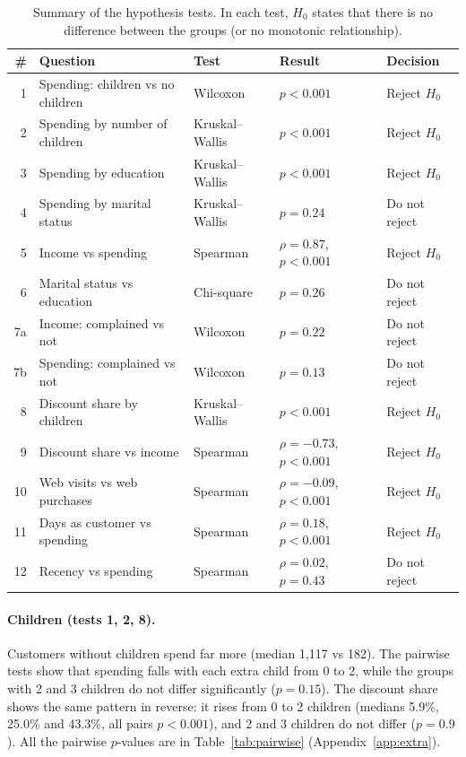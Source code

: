 \documentclass[11pt,a4paper]{article}
\begin{document}
\begin{table}[H]
	\centering
	\small
	\begin{tabular}{rllll}
		\toprule
		\# & Question                          & Test            & Result                      & Decision      \\
		\midrule
		1  & Spending: children vs no children & Wilcoxon        & $p < 0.001$                 & Reject $H_0$  \\
		2  & Spending by number of children    & Kruskal--Wallis & $p < 0.001$                 & Reject $H_0$  \\
		3  & Spending by education             & Kruskal--Wallis & $p < 0.001$                 & Reject $H_0$  \\
		4  & Spending by marital status        & Kruskal--Wallis & $p = 0.24$                  & Do not reject \\
		5  & Income vs spending                & Spearman        & $\rho = 0.87$, $p < 0.001$  & Reject $H_0$  \\
		6  & Marital status vs education       & Chi-square      & $p = 0.26$                  & Do not reject \\
		7a & Income: complained vs not         & Wilcoxon        & $p = 0.22$                  & Do not reject \\
		7b & Spending: complained vs not       & Wilcoxon        & $p = 0.13$                  & Do not reject \\
		8  & Discount share by children        & Kruskal--Wallis & $p < 0.001$                 & Reject $H_0$  \\
		9  & Discount share vs income          & Spearman        & $\rho = -0.73$, $p < 0.001$ & Reject $H_0$  \\
		10 & Web visits vs web purchases       & Spearman        & $\rho = -0.09$, $p < 0.001$ & Reject $H_0$  \\
		11 & Days as customer vs spending      & Spearman        & $\rho = 0.18$, $p < 0.001$  & Reject $H_0$  \\
		12 & Recency vs spending               & Spearman        & $\rho = 0.02$, $p = 0.43$   & Do not reject \\
		\bottomrule
	\end{tabular}
	\caption{Summary of the hypothesis tests. In each test, $H_0$ states that there is no difference between the groups (or no monotonic relationship).}
	\label{tab:tests}
\end{table}

\paragraph{Children (tests 1, 2, 8).} Customers without children spend far more (median 1,117 vs 182). The pairwise tests show that spending falls with each extra child from 0 to 2, while the groups with 2 and 3 children do not differ significantly ($p = 0.15$). The discount share shows the same pattern in reverse: it rises from 0 to 2 children (medians 5.9\%, 25.0\% and 43.3\%, all pairs $p < 0.001$), and 2 and 3 children do not differ ($p = 0.9$). All the pairwise $p$-values are in Table~\ref{tab:pairwise} (Appendix~\ref{app:extra}).
\end{document}
